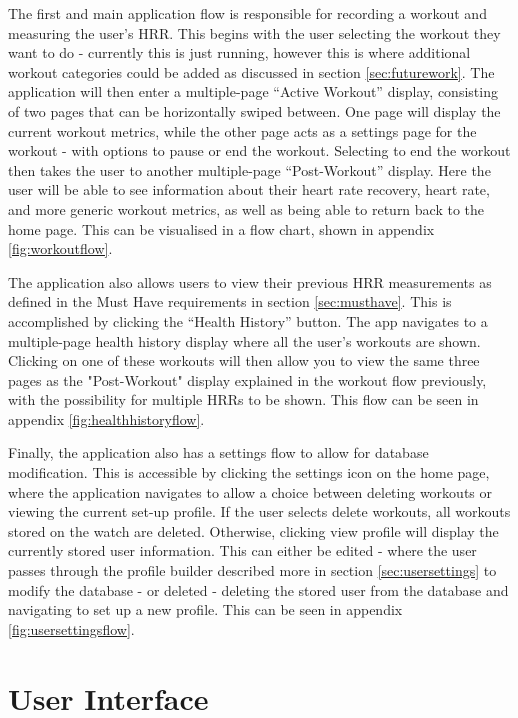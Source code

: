 \documentclass{l4proj}
\begin{document}
The first and main application flow is responsible for recording a workout and measuring the user’s HRR. This begins with the user selecting the workout they want to do - currently this is just running, however this is where additional workout categories could be added as discussed in section \ref{sec:futurework}. The application will then enter a multiple-page “Active Workout” display, consisting of two pages that can be horizontally swiped between. One page will display the current workout metrics, while the other page acts as a settings page for the workout - with options to pause or end the workout. Selecting to end the workout then takes the user to another multiple-page “Post-Workout” display. Here the user will be able to see information about their heart rate recovery, heart rate, and more generic workout metrics, as well as being able to return back to the home page. This can be visualised in a flow chart, shown in appendix \ref{fig:workoutflow}.

The application also allows users to view their previous HRR measurements as defined in the Must Have requirements in section \ref{sec:musthave}. This is accomplished by clicking the “Health History” button. The app navigates to a multiple-page health history display where all the user’s workouts are shown. Clicking on one of these workouts will then allow you to view the same three pages as the "Post-Workout" display explained in the workout flow previously, with the possibility for multiple HRRs to be shown. This flow can be seen in appendix \ref{fig:healthhistoryflow}.

Finally, the application also has a settings flow to allow for database modification. This is accessible by clicking the settings icon on the home page, where the application navigates to allow a choice between deleting workouts or viewing the current set-up profile. If the user selects delete workouts, all workouts stored on the watch are deleted. Otherwise, clicking view profile will display the currently stored user information. This can either be edited - where the user passes through the profile builder described more in section \ref{sec:usersettings} to modify the database - or deleted - deleting the stored user from the database and navigating to set up a new profile. This can be seen in appendix \ref{fig:usersettingsflow}.

\section{User Interface}
\label{sec:ui}
\end{document}
